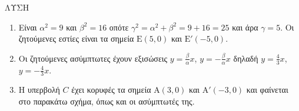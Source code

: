 \textnormal{ΛΥΣΗ}
\begin{enumerate}[α)]
    \item Είναι $\alpha^2 = 9$ και $\beta^2 = 16$ οπότε $\gamma^2 = \alpha^2 + \beta^2 = 9+16=25$ και άρα $\gamma=5$. Οι ζητούμενες εστίες είναι τα σημεία $\text{E}(5,0)$ και $\text{E}'(-5,0)$.
    \item Οι ζητούμενες ασύμπτωτες έχουν εξισώσεις $y=\frac{\beta}{\alpha}x$, $y=-\frac{\beta}{\alpha}x$ δηλαδή $y=\frac{4}{3}x$, $y=-\frac{4}{3}x$.
    \item Η υπερβολή $C$ έχει κορυφές τα σημεία $\text{A}(3,0)$ και $\text{A}'(-3,0)$ και φαίνεται στο παρακάτω σχήμα, όπως και οι ασύμπτωτές της.
\end{enumerate}
